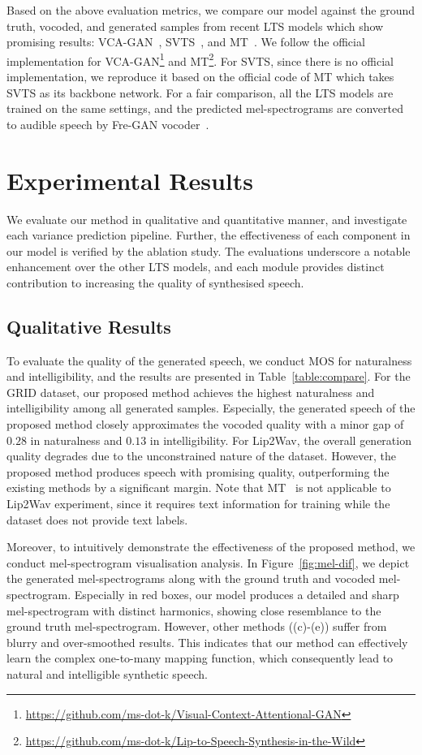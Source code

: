 \documentclass[letterpaper]{article} %
\begin{document}
Based on the above evaluation metrics, we compare our model against the ground truth, vocoded, and generated samples from recent LTS models which show promising results: VCA-GAN~\cite{kim2021lip}, SVTS~\cite{mira2022svts}, and MT~\cite{kim2023lip}. 
We follow the official implementation for VCA-GAN\footnote{\url{https://github.com/ms-dot-k/Visual-Context-Attentional-GAN}} and MT\footnote{\url{https://github.com/ms-dot-k/Lip-to-Speech-Synthesis-in-the-Wild}}. For SVTS, since there is no official implementation, we reproduce it based on the official code of MT which takes SVTS as its backbone network.
For a fair comparison, all the LTS models are trained on the same settings, and the predicted mel-spectrograms are converted to audible speech by Fre-GAN vocoder~\cite{kim21f_interspeech}.

\section{Experimental Results}
We evaluate our method in qualitative and quantitative manner, and investigate each variance prediction pipeline. Further, the effectiveness of each component in our model is verified by the ablation study. The evaluations underscore a notable enhancement over the other LTS models, and each module provides distinct contribution to increasing the quality of synthesised speech.

\subsection{Qualitative Results}
To evaluate the quality of the generated speech, we conduct MOS for naturalness and intelligibility, and the results are presented in Table~\ref{table:compare}.
For the GRID dataset, our proposed method achieves the highest naturalness and intelligibility among all generated samples.
Especially, the generated speech of the proposed method closely approximates the vocoded quality with a minor gap of $0.28$ in naturalness and $0.13$ in intelligibility.
For Lip2Wav, the overall generation quality degrades due to the unconstrained nature of the dataset.
However, the proposed method produces speech with promising quality, outperforming the existing methods by a significant margin.
Note that MT~\cite{kim2023lip} is not applicable to Lip2Wav experiment, since it requires text information for training while the dataset does not provide text labels.

Moreover, to intuitively demonstrate the effectiveness of the proposed method, we conduct mel-spectrogram visualisation analysis.
In Figure~\ref{fig:mel-dif}, we depict the generated mel-spectrograms along with the ground truth and vocoded mel-spectrogram.
Especially in red boxes, our model produces a detailed and sharp mel-spectrogram with distinct harmonics, showing close resemblance to the ground truth mel-spectrogram.
However, other methods ((c)-(e)) suffer from blurry and over-smoothed results. This indicates that our method can effectively learn the complex one-to-many mapping function, which consequently lead to natural and intelligible synthetic speech.
\end{document}

